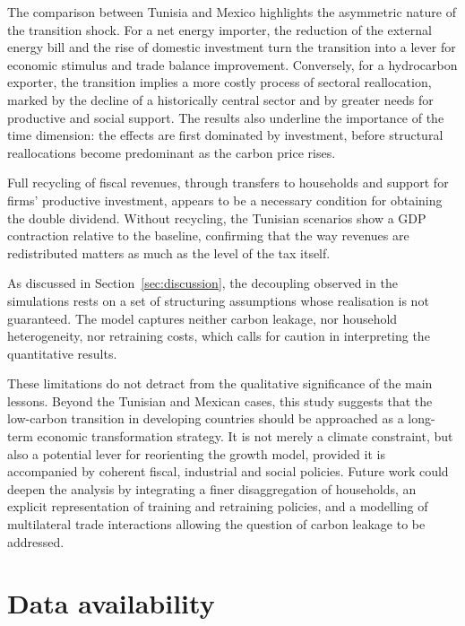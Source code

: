 \documentclass[12pt, a4paper]{article}
\begin{document}
The comparison between Tunisia and Mexico highlights the asymmetric nature of the transition shock. For a net energy importer, the reduction of the external energy bill and the rise of domestic investment turn the transition into a lever for economic stimulus and trade balance improvement. Conversely, for a hydrocarbon exporter, the transition implies a more costly process of sectoral reallocation, marked by the decline of a historically central sector and by greater needs for productive and social support. The results also underline the importance of the time dimension: the effects are first dominated by investment, before structural reallocations become predominant as the carbon price rises.

Full recycling of fiscal revenues, through transfers to households and support for firms' productive investment, appears to be a necessary condition for obtaining the double dividend. Without recycling, the Tunisian scenarios show a GDP contraction relative to the baseline, confirming that the way revenues are redistributed matters as much as the level of the tax itself.

As discussed in Section~\ref{sec:discussion}, the decoupling observed in the simulations rests on a set of structuring assumptions whose realisation is not guaranteed. The model captures neither carbon leakage, nor household heterogeneity, nor retraining costs, which calls for caution in interpreting the quantitative results.

These limitations do not detract from the qualitative significance of the main lessons. Beyond the Tunisian and Mexican cases, this study suggests that the low-carbon transition in developing countries should be approached as a long-term economic transformation strategy. It is not merely a climate constraint, but also a potential lever for reorienting the growth model, provided it is accompanied by coherent fiscal, industrial and social policies. Future work could deepen the analysis by integrating a finer disaggregation of households, an explicit representation of training and retraining policies, and a modelling of multilateral trade interactions allowing the question of carbon leakage to be addressed.

\section*{Data availability}
\end{document}
